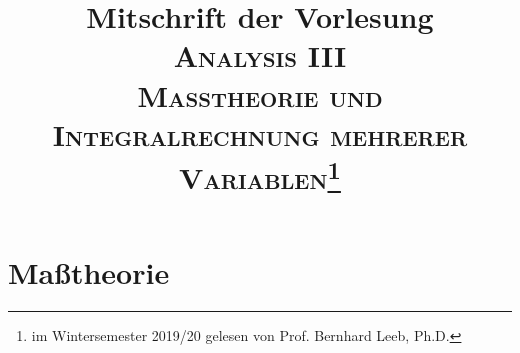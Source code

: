 
\title{\LARGE Mitschrift der Vorlesung \\ \huge \scshape Analysis III   \\ \vspace{0.2pc} \normalfont \Large Maßtheorie und Integralrechnung mehrerer Variablen\footnote{im Wintersemester 2019/20 gelesen von Prof. Bernhard Leeb, Ph.D.}}

\maketitle
\tableofcontents 
{}
\newpage
\setcounter{page}{2}
\section{Maßtheorie}
